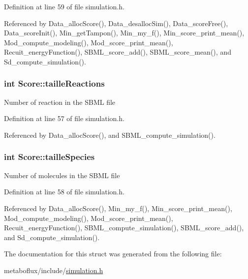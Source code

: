 Definition at line 59 of file simulation.h.



Referenced by Data\_\-allocScore(), Data\_\-desallocSim(), Data\_\-scoreFree(), Data\_\-scoreInit(), Min\_\-getTampon(), Min\_\-my\_\-f(), Min\_\-score\_\-print\_\-mean(), Mod\_\-compute\_\-modeling(), Mod\_\-score\_\-print\_\-mean(), Recuit\_\-energyFunction(), SBML\_\-score\_\-add(), SBML\_\-score\_\-mean(), and Sd\_\-compute\_\-simulation().

\hypertarget{structScore_a103843cc09238d77051b5a6ca4e48173}{
\subsubsection[{tailleReactions}]{\setlength{\rightskip}{0pt plus 5cm}int {\bf Score::tailleReactions}}}
\label{structScore_a103843cc09238d77051b5a6ca4e48173}
Number of reaction in the SBML file 

Definition at line 57 of file simulation.h.



Referenced by Data\_\-allocScore(), and SBML\_\-compute\_\-simulation().

\hypertarget{structScore_ac5a5af5f70e341fb42ea765394d86207}{
\subsubsection[{tailleSpecies}]{\setlength{\rightskip}{0pt plus 5cm}int {\bf Score::tailleSpecies}}}
\label{structScore_ac5a5af5f70e341fb42ea765394d86207}
Number of molecules in the SBML file 

Definition at line 58 of file simulation.h.



Referenced by Data\_\-allocScore(), Min\_\-my\_\-f(), Min\_\-score\_\-print\_\-mean(), Mod\_\-compute\_\-modeling(), Mod\_\-score\_\-print\_\-mean(), Recuit\_\-energyFunction(), SBML\_\-compute\_\-simulation(), SBML\_\-score\_\-add(), and Sd\_\-compute\_\-simulation().



The documentation for this struct was generated from the following file:\begin{DoxyCompactItemize}
\item 
metaboflux/include/\hyperlink{simulation_8h}{simulation.h}\end{DoxyCompactItemize}
